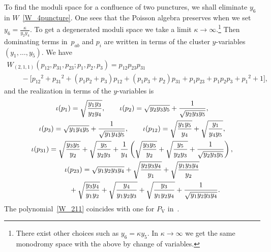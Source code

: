 \documentclass[pdftex]{sigma}
\numberwithin{equation}{section}
\begin{document}
To find the moduli space for a confluence of two punctures, we shall eliminate $y_6$ in $W$~\eqref{W_4puncture}. One sees that the Poisson algebra preserves when we set $y_6 = \frac{\kappa}{y_2 y_4}$. To get a degenerated moduli space we take a limit $\kappa\to \infty$.\footnote{There exist other choices such as $y_6=\kappa y_5$. In $\kappa\to \infty$ we get the same monodromy space with the above by change of variables.} Then dominating terms in~$p_{ab}$ and $p_i$ are written in terms of the cluster $y$-variables $(y_1,\dots,y_5)$. We have
\begin{gather}
 W_{(2,1,1)}(p_{12}, p_{31}, p_{23}; p_1, p_2, p_3) = p_{12} p_{23} p_{31}\nonumber \\
\qquad{}- \big[ {p_{12}}^2 + {p_{31}}^2 + ( p_1 p_2 + p_3 ) p_{12} + ( p_1 p_3 + p_2 ) p_{31} + p_1 p_{23} + p_1 p_2 p_3+ {p_1}^2 + 1 \big], \label{W_211}
\end{gather}
and the realization in terms of the $y$-variables is
\begin{gather}
 \iota(p_1) = \sqrt{\frac{y_1 y_3}{y_2 y_4}}, \qquad \iota(p_2) = \sqrt{y_2 y_3 y_5} + \frac{1}{\sqrt{y_2 y_3 y_5}},\nonumber \\
 \iota(p_3) = \sqrt{y_1 y_4 y_5} +\frac{1}{\sqrt{y_1 y_4 y_5}}, \qquad \iota(p_{12}) = \sqrt{\frac{ y_1 y_5}{y_4}} + \sqrt{\frac{y_1}{y_4 y_5}},\nonumber \\
 \iota(p_{31}) = \sqrt{\frac{y_3 y_5}{y_2}} + \sqrt{\frac{y_5}{y_2 y_3}} +\frac{1}{y_4} \left( \sqrt{\frac{y_3 y_5}{y_2}} +\sqrt{\frac{y_5}{y_2 y_3}} + \frac{1}{\sqrt{y_2 y_3 y_5}} \right),\nonumber \\
 \iota(p_{23}) = \sqrt{y_1 y_2 y_3 y_4} +\sqrt{\frac{y_2 y_3 y_4}{y_1}} +\sqrt{\frac{y_1 y_3 y_4}{y_2}}\nonumber \\
\hphantom{\iota(p_{23}) =}{} + \sqrt{\frac{y_3 y_4}{y_1 y_2}} +\sqrt{\frac{y_4}{y_1 y_2 y_3}} + \sqrt{\frac{y_3}{y_1 y_2 y_4}} + \frac{1}{\sqrt{y_1 y_2 y_3 y_4}} . \label{py_211}
\end{gather}
The polynomial~\eqref{W_211} coincides with one for $P_{\mathrm{V}}$ in~\cite{vdPutSaito09a}.
\end{document}
